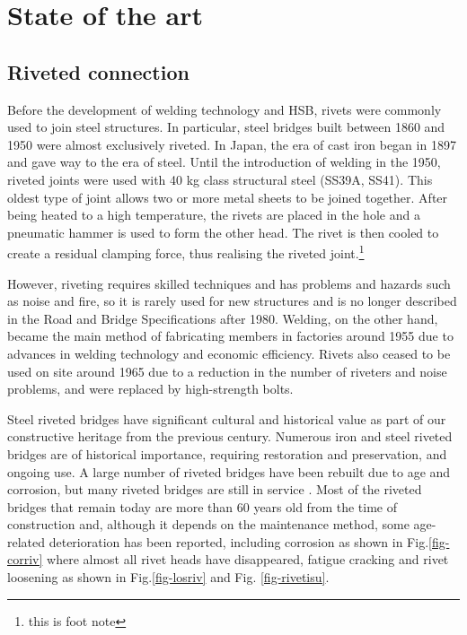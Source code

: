 \chapter{State of the art}
\label{ch2}

\begin{spacing}{1.25} %
\minitoc %
\end{spacing} %
\onehalfspacing %

\section{Riveted connection}

Before the development of welding technology and \ac{HSB}, rivets were commonly used to join steel structures. In particular, steel bridges built between 1860 and 1950 were almost exclusively riveted. In Japan, the era of cast iron began in 1897 and gave way to the era of steel. Until the introduction of welding in the 1950, riveted joints were used with 40 kg class structural steel (SS39A, SS41)\cite{rivet1934}. This oldest type of joint allows two or more metal sheets to be joined together. After being heated to a high temperature, the rivets are placed in the hole and a pneumatic hammer is used to form the other head. The rivet is then cooled to create a residual clamping force, thus realising the riveted joint.\footnote{this is foot note}

However, riveting requires skilled techniques and has problems and hazards such as noise and fire, so it is rarely used for new structures and is no longer described in the Road and Bridge Specifications after 1980. Welding, on the other hand, became the main method of fabricating members in factories around 1955 due to advances in welding technology and economic efficiency. Rivets also ceased to be used on site around 1965 due to a reduction in the number of riveters and noise problems, and were replaced by high-strength bolts.

Steel riveted bridges have significant cultural and historical value as part of our constructive heritage from the previous century. Numerous iron and steel riveted bridges are of historical importance, requiring restoration and preservation, and ongoing use. A large number of riveted bridges have been rebuilt due to age and corrosion, but many riveted bridges are still in service \cite{COLLETTE2014}. Most of the riveted bridges that remain today are more than 60 years old from the time of construction and, although it depends on the maintenance method, some age-related deterioration has been reported, including corrosion as shown in Fig.\ref{fig-corriv} where almost all rivet heads have disappeared, fatigue cracking and rivet loosening as shown in Fig.\ref{fig-losriv} and Fig. \ref{fig-rivetisu}.

